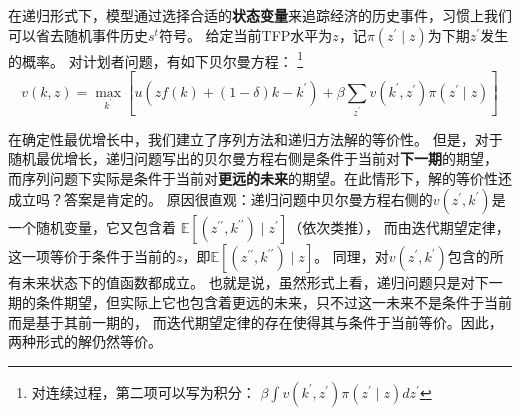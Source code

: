 在递归形式下，模型通过选择合适的\textbf{状态变量}来追踪经济的历史事件，习惯上我们可以省去随机事件历史$s^t$符号。
给定当前TFP水平为$z$，记$\pi\left(z^{\prime}\mid z\right)$为下期$z^{\prime}$发生的概率。
对计划者问题，有如下贝尔曼方程：
\footnote{对连续过程，第二项可以写为积分：
    $\beta \int v\left(k^{\prime}, z^{\prime}\right) \pi\left(z^{\prime} \mid z\right) d z^{\prime}$}
\begin{equation}    \label{eq-s-opt-growth-bellman}
    v(k, z)=\max _{k^{\prime}}\left[u\left(zf(k)+(1-\delta)k-k^{\prime}\right)
        +\beta \sum_{z^{\prime}}v\left(k^{\prime}, z^{\prime}\right) \pi\left(z^{\prime} \mid z\right)\right]
\end{equation}

在确定性最优增长中，我们建立了序列方法和递归方法解的等价性。
但是，对于随机最优增长，递归问题写出的贝尔曼方程右侧是条件于当前对\textbf{下一期}的期望，
而序列问题下实际是条件于当前对\textbf{更远的未来}的期望。在此情形下，解的等价性还成立吗？答案是肯定的。
原因很直观：递归问题中贝尔曼方程右侧的$v\left(z^{\prime},k^{\prime}\right)$是一个随机变量，它又包含着
$\mathbb{E}\left[\left(z^{\prime\prime},k^{\prime\prime}\right)\mid z^{\prime}\right]$（依次类推），
而由迭代期望定律，这一项等价于条件于当前的$z$，即$\mathbb{E}\left[\left(z^{\prime\prime},k^{\prime\prime}\right)\mid z\right]$。
同理，对$v\left(z^{\prime},k^{\prime}\right)$包含的所有未来状态下的值函数都成立。
也就是说，虽然形式上看，递归问题只是对下一期的条件期望，但实际上它也包含着更远的未来，只不过这一未来不是条件于当前而是基于其前一期的，
而迭代期望定律的存在使得其与条件于当前等价。因此，两种形式的解仍然等价。

